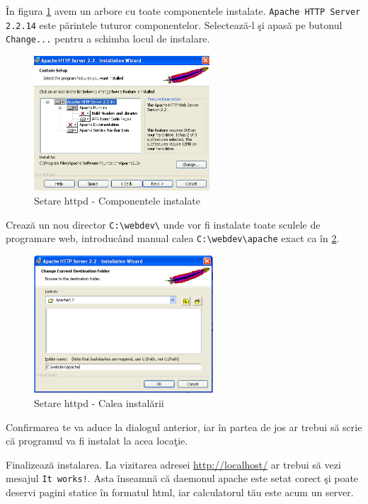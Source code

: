 În figura \ref{fig:httpd components tree} avem un arbore cu toate componentele instalate. \texttt{Apache HTTP Server 2.2.14}
este părintele tuturor componentelor. Selectează-l şi apasă pe butonul
\texttt{Change...} pentru a schimba locul de instalare.

\begin{figure}[h!]
  \centering
    \includegraphics[width=248px]{cap01/Screenshot-4.png}
  \caption{Setare httpd - Componentele instalate}
  \label{fig:httpd components tree}
\end{figure}

Crează un nou director \texttt{C:{\textbackslash}webdev\textbackslash}
unde vor fi instalate toate sculele
de programare web, introducând manual calea \texttt{C:{\textbackslash}webdev{\textbackslash}apache}
exact ca în \ref{fig:httpd custom path}.

\begin{figure}[h!]
  \centering
    \includegraphics[width=253px]{cap01/Screenshot-5.png}
  \caption{Setare httpd - Calea instalării}
  \label{fig:httpd custom path}
\end{figure}

Confirmarea te va aduce la dialogul anterior, iar în partea de jos ar trebui să scrie
că programul va fi instalat la acea locaţie.

Finalizează instalarea. La vizitarea adresei \url{http://localhost/} ar trebui să
vezi mesajul \texttt{It works!}. Asta înseamnă că daemonul apache este setat corect şi poate deservi
pagini statice în formatul html, iar calculatorul tău este acum un server.

